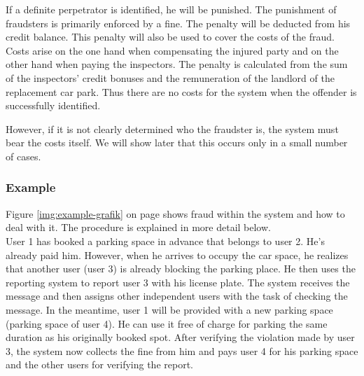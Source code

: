 \documentclass[
a4paper,     %
titlepage,   %
14pt         %
]{scrartcl}  %
\theoremstyle{mystyle}
\begin{document}
If a definite perpetrator is identified, he will be punished. The punishment of fraudsters is primarily enforced by a fine. The penalty will be deducted from his credit balance. This penalty will also be used to cover the costs of the fraud. Costs arise on the one hand when compensating the injured party and on the other hand when paying the inspectors. The penalty is calculated from the sum of the inspectors' credit bonuses and the remuneration of the landlord of the replacement car park. Thus there are no costs for the system when the offender is successfully identified. 

However, if it is not clearly determined who the fraudster is, the system must bear the costs itself. We will show later that this occurs only in a small number of cases.

\subsubsection{Example}
Figure \ref{img:example-grafik} on page \pageref{img:example-grafik} shows fraud within the system and how to deal with it. The procedure is explained in more detail below.\\

User 1 has booked a parking space in advance that belongs to user 2. He's already paid him. However, when he arrives to occupy the car space, he realizes that another user (user 3) is already blocking the parking place. He then uses the reporting system to report user 3 with his license plate. The system receives the message and then assigns other independent users with the task of checking the message. In the meantime, user 1 will be provided with a new parking space (parking space of user 4). He can use it free of charge for parking the same duration as his originally booked spot. After verifying the violation made by user 3, the system now collects the fine from him and pays user 4 for his parking space and the other users for verifying the report.\\
\end{document}
